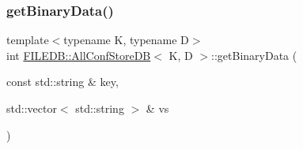 \subsubsection{\texorpdfstring{getBinaryData()}{getBinaryData()}\hspace{0.1cm}{\footnotesize\ttfamily [2/2]}}
{\footnotesize\ttfamily template$<$typename K, typename D$>$ \\
int \mbox{\hyperlink{classFILEDB_1_1AllConfStoreDB}{F\+I\+L\+E\+D\+B\+::\+All\+Conf\+Store\+DB}}$<$ K, D $>$\+::get\+Binary\+Data (\begin{DoxyParamCaption}\item[{const std\+::string \&}]{key,  }\item[{std\+::vector$<$ std\+::string $>$ \&}]{vs }\end{DoxyParamCaption})\hspace{0.3cm}{\ttfamily [inline]}}

